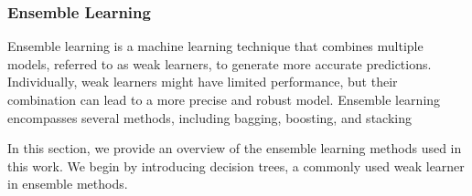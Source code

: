 \subsubsection{Ensemble Learning}
Ensemble learning is a machine learning technique that combines multiple models, referred to as weak learners, to generate more accurate predictions.
Individually, weak learners might have limited performance, but their combination can lead to a more precise and robust model.
Ensemble learning encompasses several methods, including bagging, boosting, and stacking\cite{James2023AnIS, pavlyshenko2018stacking}

In this section, we provide an overview of the ensemble learning methods used in this work.
We begin by introducing decision trees, a commonly used weak learner in ensemble methods.
